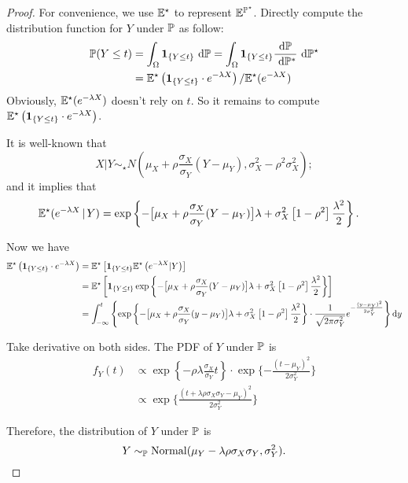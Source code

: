 \begin{proof} 
	For convenience, we use $\mathbb{E}^\star$ to represent $\mathbb{E}^{\mathbb{P}^\star}$. Directly compute the distribution function for $Y$ under $\mathbb{P}$ as follow:
	\begin{align*}
	\mathbb{P}( Y\leq t ) &=  \int_\Omega \boldsymbol{1}_{ \{ Y\leq t \} } \ \mathrm{d} \mathbb{P}  = \int_\Omega \boldsymbol{1}_{ \{ Y\leq t \} }  \frac{\mathrm{d} \mathbb{P}}{\ \mathrm{d} \mathbb{P}^\ast} \ \mathrm{d} \mathbb{P}^\star \\ 
	&= \mathbb{E}^\star \left(  \boldsymbol{1}_{ \{ Y\leq t \} } \cdot   e^{-\lambda X}     \right)/\mathbb{E}^\star( e^{-\lambda X} ) 
	\end{align*} 
	Obviously, $\mathbb{E}^\star( e^{-\lambda X} ) $ doesn't rely on $t$. So it remains to compute $\mathbb{E}^\star \left(  \boldsymbol{1}_{ \{ Y\leq t \} } \cdot   e^{-\lambda X}  \right)$.
 
		 It is well-known that
		$$X| Y \sim_\star N\left(  \mu_X + \rho\frac{ \sigma_X  }{\sigma_Y}(Y-\mu_Y), \sigma_X^2 - {\rho^2 \sigma_X^2  }    \right);$$
		and it implies that 
		\begin{align*}
		\mathbb{E}^\star(e^{-\lambda X }\hspace{1.5pt} | \hspace{1.5pt} Y) &= \exp \left\{ - \big[ \mu_X + \rho\frac{ \sigma_X  }{\sigma_Y}(Y-\mu_Y) \big] \lambda + \sigma_X^2 \left[  1 - \rho^2      \right] \frac{\lambda^2}{2} \right\}.
		\end{align*}
		
	  Now we have
		\begin{align*}
		\mathbb{E}^\star \left(  \boldsymbol{1}_{ \{ Y\leq t \} } \cdot   e^{-\lambda X}     \right) &= \mathbb{E}^\star\left[ \boldsymbol{1}_{ \{ Y\leq t \} } \mathbb{E}^\star\left( e^{-{\lambda X} }|Y \right) \right]  \\
		&= \mathbb{E}^\star\left[  \boldsymbol{1}_{ \{ Y\leq t \} }  \exp \left\{ - \big[ \mu_X + \rho\frac{ \sigma_X  }{\sigma_Y}(Y-\mu_Y) \big] \lambda + \sigma_X^2 \left[  1 - \rho^2      \right] \frac{\lambda^2}{2} \right\} \right] \\
		&= \int^t_{-\infty} \left\{ \exp \left\{ - \big[ \mu_X + \rho\frac{ \sigma_X  }{\sigma_Y}(y -\mu_Y) \big] \lambda + \sigma_X^2 \left[  1 - \rho^2      \right] \frac{\lambda^2}{2} \right\}  \cdot \frac{1}{\sqrt{ 2\pi \sigma_Y^2 }} e^{  - \frac{ (y - \mu_Y)^2 }{  2\sigma_Y^2 }  }  \right\}  \mathrm{d} y
		\end{align*}
		
		 Take derivative on both sides. The PDF of $Y$ under $\mathbb{P}$ is 
		\begin{align*}
			f_Y(t) &\propto \exp \left\{ -  \rho \lambda \frac{ \sigma_X  }{\sigma_Y} t   \right\}  \cdot   \exp\{  - \frac{ (t - \mu_Y)^2 }{  2\sigma_Y^2 }  \} \\
			&\propto \exp\{  \frac{(t + \lambda \rho \sigma_X \sigma_Y - \mu_Y )^2}{2\sigma_Y^2}  \}
		\end{align*}
  
	Therefore, the distribution of $Y$ under $\mathbb{P}$ is 
	$$Y \sim_{\mathbb{P}} \mathrm{Normal}(  \mu_Y -\lambda \rho\sigma_X \sigma_Y,  \sigma_Y^2 ).$$
\end{proof}

